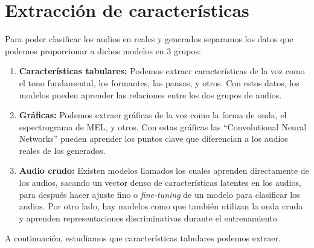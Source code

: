 \section{Extracción de características} 
\label{sec:extraccion_caracteristicas}

Para poder clasificar los audios en reales y generados separamos los datos que podemos proporcionar a dichos modelos en 3 grupos:

\begin{enumerate}
	\item \textbf{Características tabulares:} Podemos extraer características de la voz como el tono fundamental, los formantes, las pausas, y otros. Con estos datos, los modelos pueden aprender las relaciones entre los dos grupos de audios.
	\item \textbf{Gráficas:} Podemos extraer gráficas de la voz como la forma de onda, el espectrograma de MEL, y otros. Con estas gráficas las ``Convolutional Neural Networks'' pueden aprender los puntos clave que diferencian a los audios reales de los generados.
	\item \textbf{Audio crudo:} Existen modelos llamados  los cuales aprenden directamente de los audios, sacando un vector denso de características latentes en los audios, para después hacer ajuste fino o \emph{fine-tuning} de un modelo para clasificar los audios. Por otro lado, hay modelos como  que también utilizan la onda cruda y aprenden representaciones discriminativas durante el entrenamiento.  
\end{enumerate}

A continuación, estudiamos que características tabulares podemos extraer.

